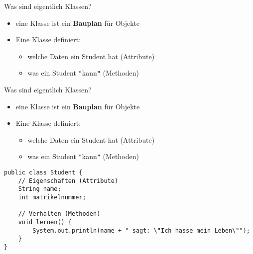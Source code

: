 \documentclass{../../presentation}
\begin{document}
\begin{frame}[fragile,t]{Was sind eigentlich Klassen?}

	\begin{minipage}[t][0.9\textheight][t]{\textwidth}
		\begin{itemize}
			\item eine Klasse ist ein \textbf{Bauplan} für Objekte
			\item<2->Eine Klasse definiert:
			      \begin{itemize}
		\item[\textbullet] welche Daten ein Student hat (Attribute)
				      \item[\textbullet] was ein Student \texttt{"}kann\texttt{"} (Methoden)
			      \end{itemize}
		\end{itemize}

		\vspace{3.5cm}
	\end{minipage}

\end{frame}



\begin{frame}[fragile,t]{Was sind eigentlich Klassen?}

	\begin{minipage}[t][0.9\textheight][t]{\textwidth}
		\begin{itemize}
			\item eine Klasse ist ein \textbf{Bauplan} für Objekte
			\item Eine Klasse definiert:
			      \begin{itemize}
				      \item[\textbullet] welche Daten ein Student hat (Attribute)
				      \item[\textbullet] was ein Student \texttt{"}kann\texttt{"} (Methoden)
			      \end{itemize}
		\end{itemize}

		\begin{verbatim}
public class Student {
    // Eigenschaften (Attribute)
    String name;
    int matrikelnummer;

    // Verhalten (Methoden)
    void lernen() {
        System.out.println(name + " sagt: \"Ich hasse mein Leben\"");
    }
}
\end{verbatim}
	\end{minipage}
\end{frame}
\end{document}
